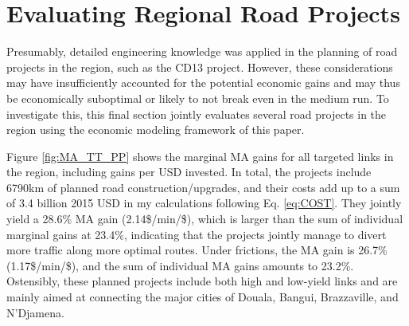 \documentclass[a4paper]{article}
\begin{document}
\section{Evaluating Regional Road Projects}

Presumably, detailed engineering knowledge was applied in the planning of road projects in the region, such as the CD13 project. However, these considerations may have insufficiently accounted for the potential economic gains and may thus be economically suboptimal or likely to not break even in the medium run. To investigate this, this final section jointly evaluates several road projects in the region using the economic modeling framework of this paper.   \newline 

Figure \ref{fig:MA_TT_PP} shows the marginal MA gains for all targeted links in the region, including gains per USD invested. In total, the projects include 6790km of planned road construction/upgrades, and their costs add up to a sum of 3.4 billion 2015 USD in my calculations following Eq. \ref{eq:COST}. They jointly yield a 28.6\% MA gain (2.14\$/min/\$), which is larger than the sum of individual marginal gains at 23.4\%, indicating that the projects jointly manage to divert more traffic along more optimal routes. Under frictions, the MA gain is 26.7\% (1.17\$/min/\$), and the sum of individual MA gains amounts to 23.2\%. Ostensibly, these planned projects include both high and low-yield links and are mainly aimed at connecting the major cities of Douala, Bangui, Brazzaville, and N'Djamena. 
\end{document}
